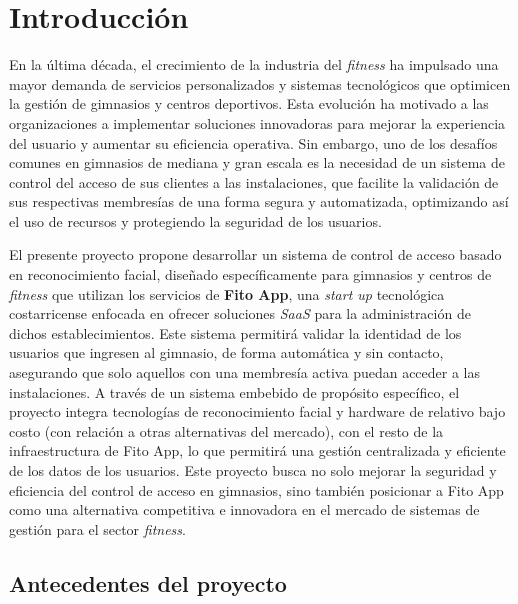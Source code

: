 
\chapter{Introducción}
\label{chp:intro}

En la última década, el crecimiento de la industria del \textit{fitness} ha impulsado una mayor demanda de servicios personalizados y sistemas tecnológicos que optimicen la gestión de gimnasios y centros deportivos. Esta evolución ha motivado a las organizaciones a implementar soluciones innovadoras para mejorar la experiencia del usuario y aumentar su eficiencia operativa. Sin embargo, uno de los desafíos comunes en gimnasios de mediana y gran escala es la necesidad de un sistema de control del acceso de sus clientes a las instalaciones, que facilite la validación de sus respectivas membresías de una forma segura y automatizada, optimizando así el uso de recursos y protegiendo la seguridad de los usuarios.

El presente proyecto propone desarrollar un sistema de control de acceso basado en reconocimiento facial, diseñado específicamente para gimnasios y centros de \textit{fitness} que utilizan los servicios de \textbf{Fito App}, una \textit{start up} tecnológica costarricense enfocada en ofrecer soluciones \textit{SaaS} para la administración de dichos establecimientos. Este sistema permitirá validar la identidad de los usuarios que ingresen al gimnasio, de forma automática y sin contacto, asegurando que solo aquellos con una membresía activa puedan acceder a las instalaciones. A través de un sistema embebido de propósito específico, el proyecto integra tecnologías de reconocimiento facial y hardware de relativo bajo costo (con relación a otras alternativas del mercado), con el resto de la infraestructura de Fito App, lo que permitirá una gestión centralizada y eficiente de los datos de los usuarios. Este proyecto busca no solo mejorar la seguridad y eficiencia del control de acceso en gimnasios, sino también posicionar a Fito App como una alternativa competitiva e innovadora en el mercado de sistemas de gestión para el sector \textit{fitness}. 


\section{Antecedentes del proyecto}

